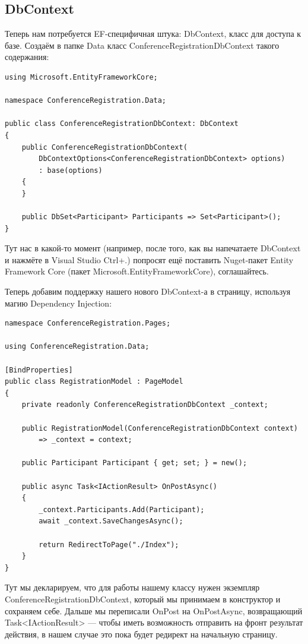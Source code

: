 \documentclass{../../text-style}
\begin{document}
\subsection{DbContext}

Теперь нам потребуется EF-специфичная штука: DbContext, класс для доступа к базе. Создаём в папке Data класс ConferenceRegistrationDbContext такого содержания:

\begin{verbatim}
using Microsoft.EntityFrameworkCore;

namespace ConferenceRegistration.Data;

public class ConferenceRegistrationDbContext: DbContext
{
    public ConferenceRegistrationDbContext(
        DbContextOptions<ConferenceRegistrationDbContext> options)
        : base(options)
    {
    }

    public DbSet<Participant> Participants => Set<Participant>();
}
\end{verbatim}

Тут нас в какой-то момент (например, после того, как вы напечатаете DbContext и нажмёте в Visual Studio Ctrl+.) попросят ещё поставить Nuget-пакет Entity Framework Core (пакет Microsoft.EntityFrameworkCore), соглашайтесь.

Теперь добавим поддержку нашего нового DbContext-а в страницу, используя магию Dependency Injection:

\begin{verbatim}
namespace ConferenceRegistration.Pages;

using ConferenceRegistration.Data;

[BindProperties]
public class RegistrationModel : PageModel
{
    private readonly ConferenceRegistrationDbContext _context;

    public RegistrationModel(ConferenceRegistrationDbContext context)
        => _context = context;

    public Participant Participant { get; set; } = new();

    public async Task<IActionResult> OnPostAsync()
    {
        _context.Participants.Add(Participant);
        await _context.SaveChangesAsync();

        return RedirectToPage("./Index");
    }
}
\end{verbatim}

Тут мы декларируем, что для работы нашему классу нужен экземпляр ConferenceRegistrationDbContext, который мы принимаем в конструктор и сохраняем себе. Дальше мы переписали OnPost на OnPostAsync, возвращающий Task<IActionResult> --- чтобы иметь возможность отправить на фронт результат действия, в нашем случае это пока будет редирект на начальную страницу.
\end{document}
